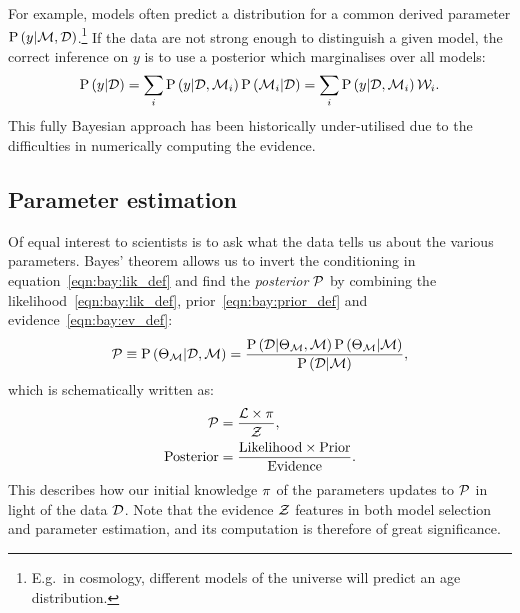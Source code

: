For example, models often predict a distribution for a common derived parameter \(\mathrm{P}\left(y\middle|\mathcal{M},\mathcal{D}\right)\).\footnote{E.g.\ in cosmology, different models of the universe will predict an age distribution.} If the data are not strong enough to distinguish a given model, the correct inference on \(y\) is to use a posterior which marginalises over all models:
\begin{equation}
  \mathrm{P}\left(y\middle|\mathcal{D}\right) 
  = \sum_i\mathrm{P}\left(y\middle|\mathcal{D},\mathcal{M}_i\right)\mathrm{P}\left(\mathcal{M}_i\middle|\mathcal{D}\right)
  = \sum_i\mathrm{P}\left(y\middle|\mathcal{D},\mathcal{M}_i\right)\mathcal{W}_i.
\end{equation}
This fully Bayesian approach has been historically under-utilised due to the difficulties in numerically computing the evidence.



\subsection{Parameter estimation}
Of equal interest to scientists is to ask what the data tells us about the various parameters.  
Bayes' theorem allows us to invert the conditioning in equation~\eqref{eqn:bay:lik_def} and find the {\em posterior\/} \(\mathcal{P}\) by combining the likelihood~\eqref{eqn:bay:lik_def}, prior~\eqref{eqn:bay:prior_def} and evidence~\eqref{eqn:bay:ev_def}:
%
\begin{equation}
  \mathcal{P}\equiv
  \mathrm{P}\left(\Theta_{\mathcal{M}}\middle|\mathcal{D},\mathcal{M}\right) = \frac{\mathrm{P}\left(\mathcal{D}\middle|\Theta_{\mathcal{M}},\mathcal{M}\right) \mathrm{P}\left(\Theta_{\mathcal{M}}\middle|\mathcal{M}\right)}{\mathrm{P}\left(\mathcal{D}\middle|\mathcal{M}\right)},
  \label{eqn:bay:bayes_theorem}
\end{equation}
%
which is schematically written as:
\begin{align}
  \mathcal{P} &= \frac{\mathcal{L} \times \pi }{\mathcal{Z} },
  \label{eqn:bay:bayes_theorem_abbrv}\\
  \mathrm{Posterior} &= \frac{\mathrm{Likelihood} \times \mathrm{Prior} }{\mathrm{Evidence} }.
\end{align}
This describes how our initial knowledge \(\pi\) of the parameters updates to \(\mathcal{P}\) in light of the data \(\mathcal{D}\). Note that the evidence \(\mathcal{Z}\) features in both model selection and parameter estimation, and its computation is therefore of great significance.








